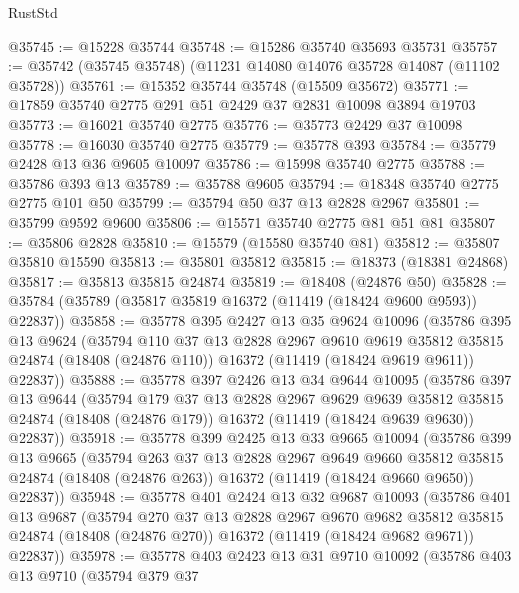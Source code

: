 \begin{lexlean}{RustStd}
\begin{coremodule}
@35745 := @15228 @35744
@35748 := @15286 @35740 @35693 @35731
@35757 := @35742 (@35745 @35748) (@11231 @14080 @14076 @35728 @14087 (@11102 @35728))
@35761 := @15352 @35744 @35748 (@15509 @35672)
@35771 := @17859 @35740 @2775 @291 @51 @2429 @37 @2831 @10098 @3894 @19703
@35773 := @16021 @35740 @2775
@35776 := @35773 @2429 @37 @10098
@35778 := @16030 @35740 @2775
@35779 := @35778 @393
@35784 := @35779 @2428 @13 @36 @9605 @10097
@35786 := @15998 @35740 @2775
@35788 := @35786 @393 @13
@35789 := @35788 @9605
@35794 := @18348 @35740 @2775 @2775 @101 @50
@35799 := @35794 @50 @37 @13 @2828 @2967
@35801 := @35799 @9592 @9600
@35806 := @15571 @35740 @2775 @81 @51 @81
@35807 := @35806 @2828
@35810 := @15579 (@15580 @35740 @81)
@35812 := @35807 @35810 @15590
@35813 := @35801 @35812
@35815 := @18373 (@18381 @24868)
@35817 := @35813 @35815 @24874
@35819 := @18408 (@24876 @50)
@35828 := @35784 (@35789 (@35817 @35819 @16372 (@11419 (@18424 @9600 @9593)) @22837))
@35858 := @35778
    @395
    @2427
    @13
    @35
    @9624
    @10096
    (@35786
      @395
      @13
      @9624
      (@35794
        @110
        @37
        @13
        @2828
        @2967
        @9610
        @9619
        @35812
        @35815
        @24874
        (@18408 (@24876 @110))
        @16372
        (@11419 (@18424 @9619 @9611))
        @22837))
@35888 := @35778
    @397
    @2426
    @13
    @34
    @9644
    @10095
    (@35786
      @397
      @13
      @9644
      (@35794
        @179
        @37
        @13
        @2828
        @2967
        @9629
        @9639
        @35812
        @35815
        @24874
        (@18408 (@24876 @179))
        @16372
        (@11419 (@18424 @9639 @9630))
        @22837))
@35918 := @35778
    @399
    @2425
    @13
    @33
    @9665
    @10094
    (@35786
      @399
      @13
      @9665
      (@35794
        @263
        @37
        @13
        @2828
        @2967
        @9649
        @9660
        @35812
        @35815
        @24874
        (@18408 (@24876 @263))
        @16372
        (@11419 (@18424 @9660 @9650))
        @22837))
@35948 := @35778
    @401
    @2424
    @13
    @32
    @9687
    @10093
    (@35786
      @401
      @13
      @9687
      (@35794
        @270
        @37
        @13
        @2828
        @2967
        @9670
        @9682
        @35812
        @35815
        @24874
        (@18408 (@24876 @270))
        @16372
        (@11419 (@18424 @9682 @9671))
        @22837))
@35978 := @35778
    @403
    @2423
    @13
    @31
    @9710
    @10092
    (@35786
      @403
      @13
      @9710
      (@35794
        @379
        @37

\end{coremodule}
\end{lexlean}
